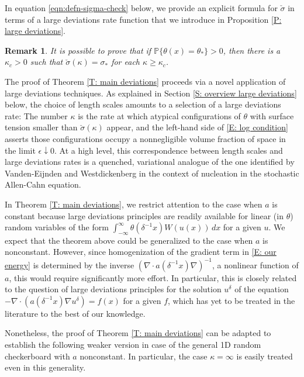 \documentclass[12pt]{amsart}
\newtheorem{remark}{Remark}
\begin{document}
In equation \eqref{eqn:defn-sigma-check} below, we provide an explicit formula for $ \check\sigma $ in terms of a large deviations rate function that we introduce in Proposition \ref{P: large deviations}.

	\begin{remark} \label{R: eventually constant} It is possible to prove that if $\mathbb{P} \{ \theta(x) = \theta_{*} \} > 0$, then there is a $\kappa_{c} > 0$ such that $\check{\sigma}(\kappa) = \sigma_{*}$ for each $\kappa \geq \kappa_{c}$. \end{remark}
	
The proof of Theorem \ref{T: main deviations} proceeds via a novel application of large deviations techniques.  As explained in Section \ref{S: overview large deviations} below, the choice of length scales amounts to a selection of a large deviations rate: The number $\kappa$ is the rate at which atypical configurations of $\theta$ with surface tension smaller than $\check{\sigma}(\kappa)$ appear, and the left-hand side of \eqref{E: log condition} asserts those configurations occupy a nonnegligible volume fraction of space in the limit $\epsilon \downarrow 0$.    At a high level, this correspondence between length scales and large deviations rates is a quenched, variational analogue of the one identified by Vanden-Eijnden and Westdickenberg \cite{vanden-eijnden_westdickenberg} in the context of nucleation in the stochastic Allen-Cahn equation.

In Theorem \ref{T: main deviations}, we restrict attention to the case when $a$ is constant because large deviations principles are readily available for linear (in $\theta$) random variables of the form $\int_{-\infty}^{\infty} \theta(\delta^{-1} x) W(u(x)) \, dx$ for a given $u$.  We expect that the theorem above could be generalized to the case when $a$ is nonconstant.  However, since homogenization of the gradient term in \eqref{E: our energy} is determined by the inverse $( \nabla \cdot a(\delta^{-1} x) \nabla )^{-1}$, a nonlinear function of $a$, this would require significantly more effort.  In particular, this is closely related to the question of large deviations principles for the solution $u^{\delta}$ of the equation $-\nabla \cdot ( a ( \delta^{-1} x ) \nabla u^{\delta} ) = f(x)$ for a given $f$, which has yet to be treated in the literature to the best of our knowledge.

Nonetheless, the proof of Theorem \ref{T: main deviations} can be adapted to establish the following weaker version in case of the general 1D random checkerboard with $a$ nonconstant.  In particular, the case $\kappa =  \infty$ is easily treated even in this generality.
\end{document}
